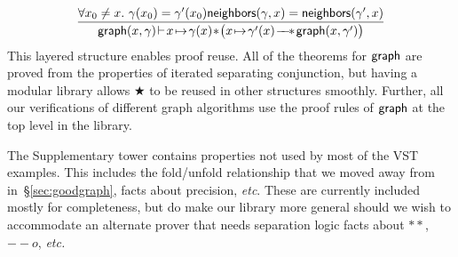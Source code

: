 \begin{equation}
\label{lem:updategraphnode}
\frac
{\forall x_0 \neq x.~ \gamma(x_0) = \gamma'(x_0) \\ \p{neighbors}(\gamma,x)=\p{neighbors}(\gamma',x)}
{\p{graph}(x, \gamma) \! |- \! x \! \mapsto \! \gamma(x) \! * \! \big(x \! \mapsto \! \gamma'(x) \! \wand \! \p{graph}(x, \gamma')\big)}
\end{equation}
This layered structure enables proof reuse. All of the theorems for $\mathsf{graph}$ are proved from the properties of iterated separating conjunction, but having a modular library allows $\bigstar$ to be reused in other structures smoothly.
Further, all our verifications of different graph algorithms use the proof rules of $\mathsf{graph}$ at the top level in the library. 


The Supplementary tower contains properties not used by most of the VST examples.
This includes the fold/unfold relationship that we moved away from 
in~\S\ref{sec:goodgraph}, facts
about precision, \emph{etc}. These are currently included mostly for completeness,
but do make our library more general should we wish to accommodate an alternate
prover that needs separation logic facts about $**$,  $--o$, \emph{etc.}



%


